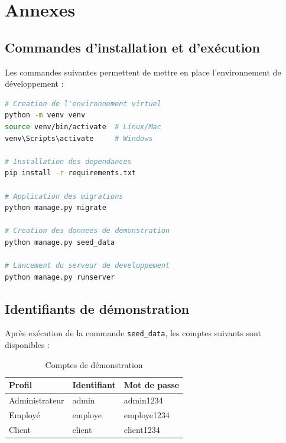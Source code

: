 \chapter{Annexes}

\section{Commandes d'installation et d'exécution}
Les commandes suivantes permettent de mettre en place l'environnement de développement :

\begin{lstlisting}[language=bash,caption={Installation et exécution de l'application}]
# Creation de l'environnement virtuel
python -m venv venv
source venv/bin/activate  # Linux/Mac
venv\Scripts\activate     # Windows

# Installation des dependances
pip install -r requirements.txt

# Application des migrations
python manage.py migrate

# Creation des donnees de demonstration
python manage.py seed_data

# Lancement du serveur de developpement
python manage.py runserver
\end{lstlisting}

\section{Identifiants de démonstration}
Après exécution de la commande \texttt{seed\_data}, les comptes suivants sont disponibles :

\begin{table}[H]
\centering
\caption{Comptes de démonstration}
\begin{tabularx}{\textwidth}{|l|l|X|}
\hline
\textbf{Profil} & \textbf{Identifiant} & \textbf{Mot de passe} \\
\hline
Administrateur & admin & admin1234 \\
\hline
Employé & employe & employe1234 \\
\hline
Client & client & client1234 \\
\hline
\end{tabularx}
\end{table}

